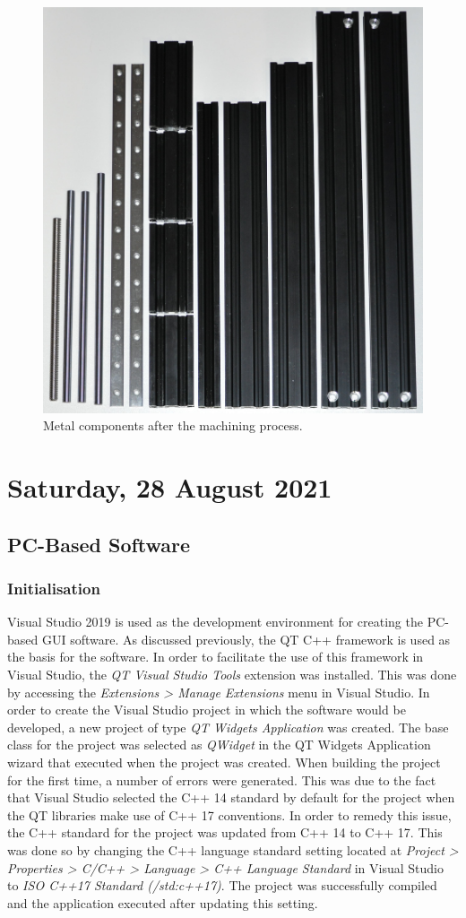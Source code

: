 \begin{figure}[H]
	\centering
	\includegraphics[width=0.5\linewidth]{figures/202108/machined-components.JPG}
	\caption{Metal components after the machining process.}
	\label{fig:machined-components}
\end{figure}

\pendsign

\section[2021/08/28]{Saturday, 28 August 2021}

\subsection{PC-Based Software}

\subsubsection{Initialisation}

Visual Studio 2019 is used as the development environment for creating the PC-based \ac{GUI} software. As discussed previously, the QT C++ framework is used as the basis for the software. In order to facilitate the use of this framework in Visual Studio, the \textit{QT Visual Studio Tools} extension was installed. This was done by accessing the \textit{Extensions > Manage Extensions} menu in Visual Studio. In order to create the Visual Studio project in which the software would be developed, a new project of type \textit{QT Widgets Application} was created. The base class for the project was selected as \textit{QWidget} in the QT Widgets Application wizard that executed when the project was created. When building the project for the first time, a number of errors were generated. This was due to the fact that Visual Studio selected the C++ 14 standard by default for the project when the QT libraries make use of C++ 17 conventions. In order to remedy this issue, the C++ standard for the project was updated from C++ 14 to C++ 17. This was done so by changing the C++ language standard setting located at \textit{Project > Properties > C/C++ > Language > C++ Language Standard} in Visual Studio to \textit{ISO C++17 Standard (/std:c++17)}. The project was successfully compiled and the application executed after updating this setting.

